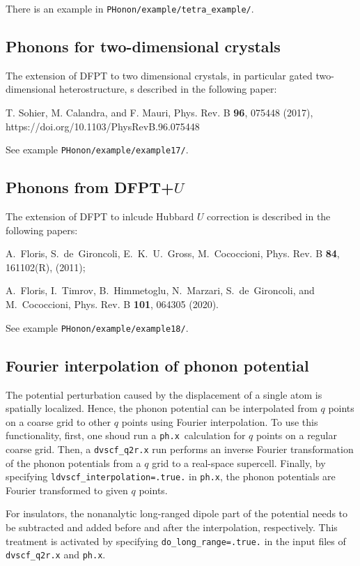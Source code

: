 \documentclass[12pt,a4paper]{article}
\def\phx{\texttt{ph.x}}
\begin{document}
There is an example in \verb|PHonon/example/tetra_example/|.

\subsection{Phonons for two-dimensional crystals}

The extension of DFPT to two dimensional crystals,
in particular gated two-dimensional heterostructure,
s described in the following paper:

T. Sohier, M. Calandra, and F. Mauri, Phys. Rev. B {\bf 96}, 075448 (2017),
https://doi.org/10.1103/PhysRevB.96.075448

See example  \verb|PHonon/example/example17/|.

\subsection{Phonons from DFPT+$U$}

The extension of DFPT to inlcude Hubbard $U$ correction is described
in the following papers:

A.~Floris, S.~de~Gironcoli, E.~K.~U.~Gross, M.~Cococcioni, Phys. Rev. B {\bf 84}, 
161102(R), (2011);

A.~Floris, I.~Timrov, B.~Himmetoglu, N.~Marzari, S.~de~Gironcoli, and M.~Cococcioni, 
Phys. Rev. B {\bf 101}, 064305 (2020).

See example  \verb|PHonon/example/example18/|.

\subsection{Fourier interpolation of phonon potential}

The potential perturbation caused by the displacement of a single atom is
spatially localized. Hence, the phonon potential can be interpolated from
$q$ points on a coarse grid to other $q$ points using Fourier interpolation.
To use this functionality, first, one shoud run a \phx\ calculation for $q$
points on a regular coarse grid.
Then, a \texttt{dvscf\_q2r.x} run performs an inverse Fourier
transformation of the phonon potentials from a $q$ grid to a real-space
supercell. Finally, by specifying \texttt{ldvscf\_interpolation=.true.} in
\phx, the phonon potentials are Fourier transformed to given $q$ points.

For insulators, the nonanalytic long-ranged dipole part of the potential needs
to be subtracted and added before and after the interpolation, respectively.
This treatment is activated by specifying \texttt{do\_long\_range=.true.} in the
input files of \texttt{dvscf\_q2r.x} and \phx.
\end{document}
